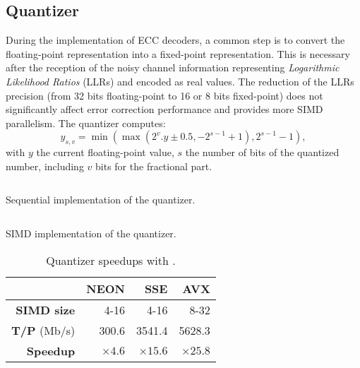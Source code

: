 \subsection{Quantizer}

During the implementation of ECC decoders, a common step is to convert the
floating-point representation into a fixed-point representation. This is
necessary after the reception of the noisy channel information representing
\textit{Logarithmic Likelihood Ratios} (LLRs) and encoded as real values. The
reduction of the LLRs precision (from 32 bits floating-point to 16 or 8 bits
fixed-point) does not significantly affect error correction performance and
provides more SIMD parallelism. The quantizer computes:
\begin{equation*}
y_{s,v} = \min(\max(2^v . y \pm 0.5, -2^{s-1} +1), 2^{s-1} -1),
\end{equation*}
with $y$ the current floating-point value, $s$ the number of bits of the
quantized number, including $v$ bits for the fractional part.

\begin{listing}[htp]
  \inputminted[frame=lines,linenos]{C++}{main/chapter3/src/quantizer/quantizer_seq.cpp}
  \caption{Sequential implementation of the quantizer.}
  \label{lst:vec_quantizer_seq}
\end{listing}

\begin{listing}[htp]
  \inputminted[frame=lines,linenos]{C++}{main/chapter3/src/quantizer/quantizer_simd.cpp}
  \caption{SIMD implementation of the quantizer.}
  \label{lst:vec_quantizer_simd}
\end{listing}

\begin{table}[htp]
  \centering
  \caption{Quantizer speedups with \MIPP.}
  \label{tab:vec_quantizer_speedup}
  \begin{tabular}{r | r  r r}
                      & \textbf{NEON} & \textbf{SSE}  & \textbf{AVX}  \\ \hline \hline
  \textbf{SIMD size}  & 4-16          & 4-16          & 8-32          \\ %
  \textbf{T/P} (Mb/s) & 300.6         & 3541.4        & 5628.3        \\ %
  \textbf{Speedup}    & $\times 4.6$  & $\times 15.6$ & $\times 25.8$ \\
  \end{tabular}
\end{table}

